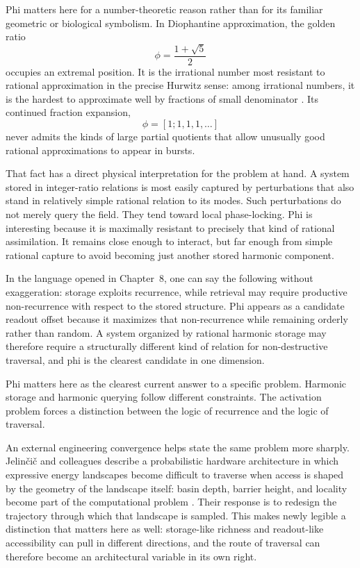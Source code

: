 Phi matters here for a number-theoretic reason rather than for its familiar geometric or biological symbolism. In Diophantine approximation, the golden ratio
$$\phi = \frac{1 + \sqrt{5}}{2}$$
occupies an extremal position. It is the irrational number most resistant to rational approximation in the precise Hurwitz sense: among irrational numbers, it is the hardest to approximate well by fractions of small denominator \parencite{hurwitz_1891}. Its continued fraction expansion,
$$\phi = [1;1,1,1,\dots]$$
never admits the kinds of large partial quotients that allow unusually good rational approximations to appear in bursts.

That fact has a direct physical interpretation for the problem at hand. A system stored in integer-ratio relations is most easily captured by perturbations that also stand in relatively simple rational relation to its modes. Such perturbations do not merely query the field. They tend toward local phase-locking. Phi is interesting because it is maximally resistant to precisely that kind of rational assimilation. It remains close enough to interact, but far enough from simple rational capture to avoid becoming just another stored harmonic component.

In the language opened in Chapter~8, one can say the following without exaggeration: storage exploits recurrence, while retrieval may require productive non-recurrence with respect to the stored structure. Phi appears as a candidate readout offset because it maximizes that non-recurrence while remaining orderly rather than random. A system organized by rational harmonic storage may therefore require a structurally different kind of relation for non-destructive traversal, and phi is the clearest candidate in one dimension.

Phi matters here as the clearest current answer to a specific problem. Harmonic storage and harmonic querying follow different constraints. The activation problem forces a distinction between the logic of recurrence and the logic of traversal.

An external engineering convergence helps state the same problem more sharply. Jelin{\v{c}}i{\v{c}} and colleagues describe a probabilistic hardware architecture in which expressive energy landscapes become difficult to traverse when access is shaped by the geometry of the landscape itself: basin depth, barrier height, and locality become part of the computational problem \parencite{jelincic_2025}. Their response is to redesign the trajectory through which that landscape is sampled. This makes newly legible a distinction that matters here as well: storage-like richness and readout-like accessibility can pull in different directions, and the route of traversal can therefore become an architectural variable in its own right.

